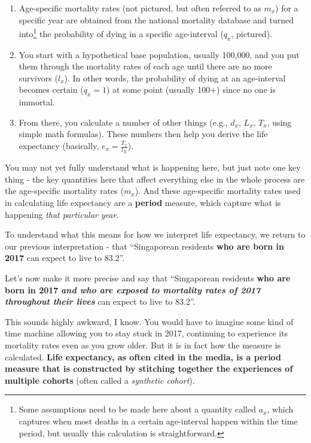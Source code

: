 \documentclass[openany]{book}
\let\rmarkdownfootnote\footnote%
\def\footnote{\protect\rmarkdownfootnote}
\begin{document}
\begin{enumerate}
\def\labelenumi{\arabic{enumi}.}
\item
  Age-specific mortality rates (not pictured, but often referred to as
  \(m_x\)) for a specific year are obtained from the national mortality
  database and turned into\footnote{Some assumptions need to be made
    here about a quantity called \(a_x\), which captures when most
    deaths in a certain age-interval happen within the time period, but
    usually this calculation is straightforward.} the probability of
  dying in a specific age-interval (\(q_x\), pictured).
\item
  You start with a hypothetical base population, usually 100,000, and
  you put them through the mortality rates of each age until there are
  no more survivors (\(l_x\)). In other words, the probability of dying
  at an age-interval becomes certain (\(q_x = 1\)) at some point
  (usually 100+) since no one is immortal.
\item
  From there, you calculate a number of other things (e.g., \(d_x\),
  \(L_x\), \(T_x\), using simple math formulas). These numbers then help
  you derive the life expectancy (basically, \(e_x = \frac{T_x}{l_X}\)).
\end{enumerate}

You may not yet fully understand what is happening here, but just note
one key thing - the key quantities here that affect everything else in
the whole process are the age-specific mortality rates (\(m_x\)). And
these age-specific mortality rates used in calculating life expectancy
are a \textbf{period} measure, which capture what is happening
\emph{that particular year}.

To understand what this means for how we interpret life expectancy, we
return to our previous interpretation - that ``Singaporean residents
\textbf{who are born in 2017} can expect to live to 83.2''.

Let's now make it more precise and say that ``Singaporean residents
\textbf{who are born in 2017} \emph{\textbf{and who are exposed to
mortality rates of 2017 throughout their lives}} can expect to live to
83.2''.

This sounds highly awkward, I know. You would have to imagine some kind
of time machine allowing you to stay stuck in 2017, continuing to
experience its mortality rates even as you grow older. But it is in fact
how the measure is calculated. \textbf{Life expectancy, as often cited
in the media, is a period measure that is constructed by stitching
together the experiences of multiple cohorts} (often called a
\emph{synthetic cohort}).
\end{document}
